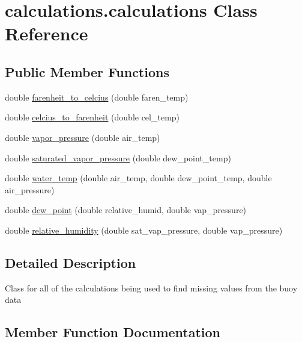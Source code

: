 \hypertarget{classcalculations_1_1calculations}{}\section{calculations.\+calculations Class Reference}
\label{classcalculations_1_1calculations}
\subsection*{Public Member Functions}
\begin{DoxyCompactItemize}
\item 
double \mbox{\hyperlink{classcalculations_1_1calculations_ab85048dd6fa5d535ea173d996b3968c1}{farenheit\+\_\+to\+\_\+celcius}} (double faren\+\_\+temp)
\item 
double \mbox{\hyperlink{classcalculations_1_1calculations_a263a1903afa9a2de7221d69feb45d379}{celcius\+\_\+to\+\_\+farenheit}} (double cel\+\_\+temp)
\item 
double \mbox{\hyperlink{classcalculations_1_1calculations_af2e526ba0ac77a303d9b458c2642e5f4}{vapor\+\_\+pressure}} (double air\+\_\+temp)
\item 
double \mbox{\hyperlink{classcalculations_1_1calculations_a2b7da37ed1c95d9894ac9dff614db9e7}{saturated\+\_\+vapor\+\_\+pressure}} (double dew\+\_\+point\+\_\+temp)
\item 
double \mbox{\hyperlink{classcalculations_1_1calculations_ae71bcea53dda2efe2673f2a4897ab684}{water\+\_\+temp}} (double air\+\_\+temp, double dew\+\_\+point\+\_\+temp, double air\+\_\+pressure)
\item 
double \mbox{\hyperlink{classcalculations_1_1calculations_a37b4b4129f95710ac3ed3598d749971c}{dew\+\_\+point}} (double relative\+\_\+humid, double vap\+\_\+pressure)
\item 
double \mbox{\hyperlink{classcalculations_1_1calculations_a9577ccf9df8aeea64ea3fa629bc0ea71}{relative\+\_\+humidity}} (double sat\+\_\+vap\+\_\+pressure, double vap\+\_\+pressure)
\end{DoxyCompactItemize}


\subsection{Detailed Description}
Class for all of the calculations being used to find missing values from the buoy data 

\subsection{Member Function Documentation}
\mbox{\label{classcalculations_1_1calculations_a263a1903afa9a2de7221d69feb45d379}} 
